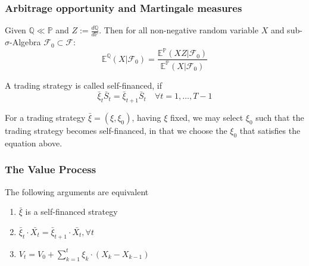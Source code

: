 \subsubsection{Arbitrage opportunity and Martingale measures}
\begin{theorem}
	Given $\mathbb{Q} \ll \mathbb{P}$ and $Z := \frac{d\mathbb{Q}}{d\mathbb{P}}$. Then for all non-negative random variable $X$ and sub-$\sigma$-Algebra $\mathcal{F}_0 \subset \mathcal{F}$:
	\begin{equation*}
		\mathbb{E}^{\mathbb{Q}}(X|\mathcal{F}_0) =\frac{\mathbb{E}^{\mathbb{P}}(XZ|\mathcal{F}_0)}{\mathbb{E}^{\mathbb{P}}(X|\mathcal{F}_0)}  
	\end{equation*}
\end{theorem}

\begin{theorem}
\end{theorem}

\begin{definition}
	A trading strategy is called self-financed, if
	\begin{equation*}
		\bar{\xi}_t \bar{S}_t = \bar{\xi}_{t+1} \bar{S}_t \quad \forall t = 1, \dots, T-1
	\end{equation*}
\end{definition}
\begin{remark}
For a trading strategy $\bar{\xi} = (\xi, \xi_0)$, having $\xi$ fixed, we may select $\xi_0$ such that the trading strategy becomes self-financed, in that we choose the $\xi_0$ that satisfies the equation above.  
\end{remark}

\subsubsection*{The Value Process}


\begin{lemma}
	The following arguments are equivalent
	\begin{enumerate}
		\item $\bar{\xi}$ is a self-financed strategy
		\item $\bar{\xi}_t \cdot \bar{X_t} = \bar{\xi}_{t + 1} \cdot \bar{X_t}, \forall t$
		\item $V_t = V_0 + \sum_{k = 1}^t \xi_k \cdot (X_k - X_{k - 1})$
	\end{enumerate}
\end{lemma}

